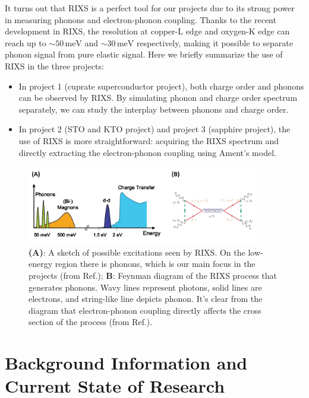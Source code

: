 \documentclass[11pt]{article}
\begin{document}
It turns out that RIXS is a perfect tool for our projects due to its strong power in measuring phonons and electron-phonon coupling. Thanks to the recent development in RIXS, the resolution at copper-L edge and oxygen-K edge can reach up to $\sim 50\,\mathrm{meV}$ and $\sim 30\,\mathrm{meV}$ respectively, making it possible to separate phonon signal from pure elastic signal. Here we briefly summarize the use of RIXS in the three projects:
\begin{itemize}
  \item In project 1 (cuprate superconductor project), both charge order and phonons can be observed by RIXS. By simulating phonon and charge order spectrum separately, we can study the interplay between phonons and charge order. 
  \item In project 2 (STO and KTO project) and project 3 (sapphire project), the use of RIXS is more straightforward: acquiring the RIXS spectrum and directly extracting the electron-phonon coupling using Ament's model.
\end{itemize}


\begin{figure}[!t]
    \centering
    \includegraphics[width=0.9\textwidth]{figures/figure2.jpg}
    \caption{\textbf{(A)}: A sketch of possible excitations seen by RIXS. On the low-energy region there is phonons, which is our main focus in the projects (from Ref.\cite{ament_resonant_2011}); \textbf{B}: Feynman diagram of the RIXS process that generates phonons. Wavy lines represent photons, solid lines are electrons, and string-like line depicts phonon. It's clear from the diagram that electron-phonon coupling directly affects the cross section of the process (from Ref.\cite{devereaux_directly_2016}).}  
    \label{second_figure}
\end{figure}

\section{Background Information and Current State of Research}
\end{document}
